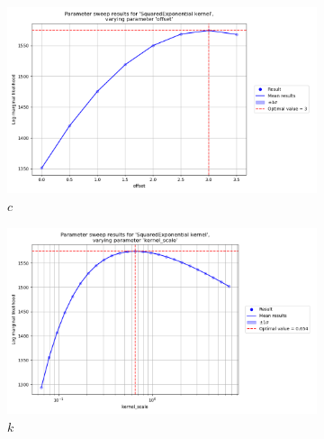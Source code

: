 \documentclass{article}
\begin{document}
\begin{figure}[pht]
    \centering
    \begin{subfigure}{0.45\textwidth}
        \centering
        \includegraphics[width=\textwidth]{param_sweep/SquaredExponential/Parameter_sweep_results_for__SquaredExponential_kernel_,_varying_parameter__offset_.png}
        \caption{$c$}
        \label{fig:sqe offset}
    \end{subfigure}
    \begin{subfigure}{0.45\textwidth}
        \centering
        \includegraphics[width=\textwidth]{param_sweep/SquaredExponential/Parameter_sweep_results_for__SquaredExponential_kernel_,_varying_parameter__kernel_scale_.png}
        \caption{$k$}
        \label{fig:sqe kernel scale}
    \end{subfigure}
    \newline
    \begin{subfigure}{0.45\textwidth}
        \centering

\end{subfigure}
\end{figure}
\end{document}
